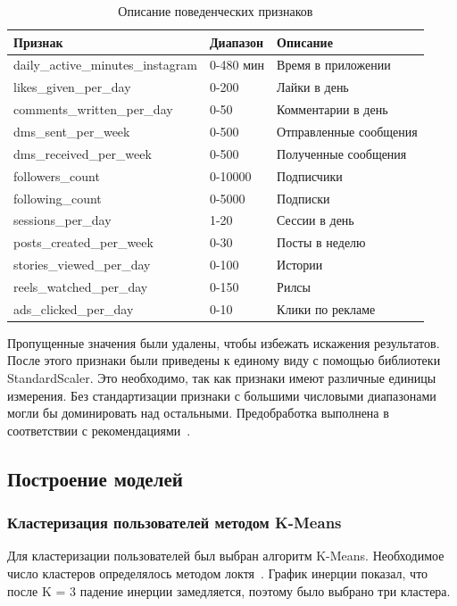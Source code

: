 \documentclass[14pt, a4paper]{extarticle}
\begin{document}
\begin{table}[h!]
\centering
\caption{Описание поведенческих признаков}
\begin{tabular}{|l|l|l|}
\hline
\textbf{Признак} & \textbf{Диапазон} & \textbf{Описание} \\
\hline
daily\_active\_minutes\_instagram & 0-480 мин & Время в приложении \\
\hline
likes\_given\_per\_day & 0-200 & Лайки в день \\
\hline
comments\_written\_per\_day & 0-50 & Комментарии в день \\
\hline
dms\_sent\_per\_week & 0-500 & Отправленные сообщения \\
\hline
dms\_received\_per\_week & 0-500 & Полученные сообщения \\
\hline
followers\_count & 0-10000 & Подписчики \\
\hline
following\_count & 0-5000 & Подписки \\
\hline
sessions\_per\_day & 1-20 & Сессии в день \\
\hline
posts\_created\_per\_week & 0-30 & Посты в неделю \\
\hline
stories\_viewed\_per\_day & 0-100 & Истории \\
\hline
reels\_watched\_per\_day & 0-150 & Рилсы \\
\hline
ads\_clicked\_per\_day & 0-10 & Клики по рекламе \\
\hline
\end{tabular}
\end{table}

Пропущенные значения были удалены, чтобы избежать искажения результатов. После этого признаки были приведены к единому виду с помощью библиотеки StandardScaler. Это необходимо, так как признаки имеют различные единицы измерения. Без стандартизации признаки с большими числовыми диапазонами могли бы доминировать над остальными. Предобработка выполнена в соответствии с рекомендациями~\cite{chubukova2024}.

\subsection{Построение моделей}

\subsubsection{Кластеризация пользователей методом K-Means}

Для кластеризации пользователей был выбран алгоритм K-Means. Необходимое число кластеров определялось методом локтя~\cite{vorontsov}. График инерции показал, что после K = 3 падение инерции замедляется, поэтому было выбрано три кластера.
\end{document}
